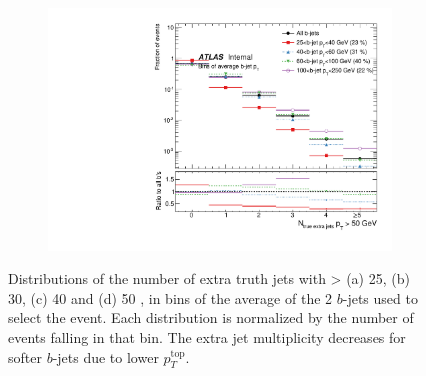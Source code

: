 \begin{figure}
\begin{subfigure}[]{0.45\textwidth}
\end{subfigure}
~
\begin{subfigure}[]{0.45\textwidth}
\includegraphics[width=\textwidth]{fig/TruthNotReco/BJetNJets50.pdf}
\end{subfigure}

\caption{Distributions of the number of extra truth jets with \pt > (a) 25, (b) 30, (c) 40 and (d) 50 \GeV, in bins of the average \pt of the 2 $b$-jets used to select the event. Each distribution is normalized by the number of events falling in that bin. The extra jet multiplicity decreases for softer $b$-jets due to lower $p_{T}^{\textrm{top}}$.}
\label{fig:truebextramult}

\end{figure}


